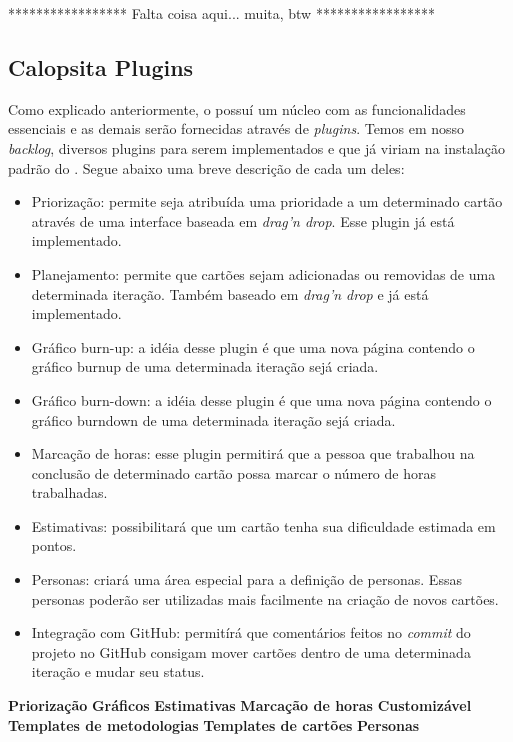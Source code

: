 *****************
Falta coisa aqui... muita, btw
*****************

 

\subsection{Calopsita Plugins}

Como explicado anteriormente, o \calopsita{} possuí um núcleo com as funcionalidades essenciais e as demais serão fornecidas através de \textit{plugins}. Temos em nosso \textit{backlog}, diversos plugins para serem implementados e que já viriam na instalação padrão do \calopsita{}. Segue abaixo uma breve descrição de cada um deles:

\begin{itemize}
	\item{Priorização: permite seja atribuída uma prioridade a um determinado cartão através de uma interface baseada em \textit{drag'n drop}. Esse plugin já está implementado.}
	\item{Planejamento: permite que cartões sejam adicionadas ou removidas de uma determinada iteração. Também baseado em \textit{drag'n drop} e já está implementado.}
	\item{Gráfico burn-up: a idéia desse plugin é que uma nova página contendo o gráfico burnup de uma determinada iteração sejá criada.}
	\item{Gráfico burn-down: a idéia desse plugin é que uma nova página contendo o gráfico burndown de uma determinada iteração sejá criada.}
	\item{Marcação de horas: esse plugin permitirá que a pessoa que trabalhou na conclusão de determinado cartão possa marcar o número de horas trabalhadas.}
	\item{Estimativas: possibilitará que um cartão tenha sua dificuldade estimada em pontos.}
	\item{Personas: criará uma área especial para a definição de personas. Essas personas poderão ser utilizadas mais facilmente na criação de novos cartões.}
	\item{Integração com GitHub: permitírá que comentários feitos no \textit{commit} do projeto no GitHub consigam mover cartões dentro de uma determinada iteração e mudar seu status.}
\end{itemize}


\textbf{Priorização}
\textbf{Gráficos}
\textbf{Estimativas}
\textbf{Marcação de horas}
\textbf{Customizável}
\textbf{Templates de metodologias}
\textbf{Templates de cartões}
\textbf{Personas}


